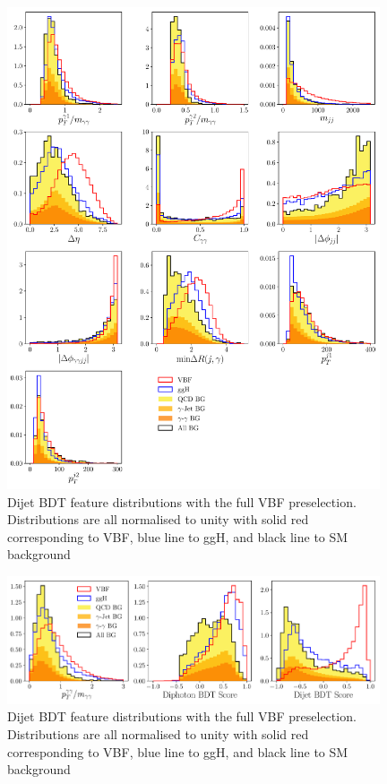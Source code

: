 \begin{figure}[h!]
    \includegraphics[width=0.98\textwidth]{figures/appendix_VBFLPS/dijet_BDT_features_splitBG_LPS.pdf}
    \caption{Dijet BDT feature distributions with the full VBF preselection. Distributions are all normalised to unity with solid red corresponding to VBF, blue line to ggH, and black line to SM background}
    \label{fig:vbf_lps_appendix:dijet_bdt_features}
\end{figure}
%
\begin{figure}[h!]
    \includegraphics[width=0.98\textwidth]{figures/appendix_VBFLPS/combined_BDT_features_splitBG_LPS.pdf}
    \caption{Dijet BDT feature distributions with the full VBF preselection. Distributions are all normalised to unity with solid red corresponding to VBF, blue line to ggH, and black line to SM background}
    \label{fig:vbf_lps_appendix:dijet_bdt_features}
\end{figure}
